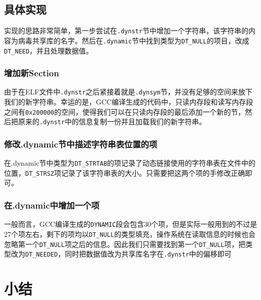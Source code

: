\documentclass[a4paper, 11pt]{article}
\begin{document}
\subsection{具体实现}
实现的思路非常简单，第一步尝试在\texttt{.dynstr}节中增加一个字符串，该字符串的内容为病毒共享库的名字。然后在\texttt{.dynamic}节中找到类型为\texttt{DT\_NULL}的项目，改成\texttt{DT\_NEED}，并且处理数据值。
\subsubsection{增加新Section}
由于在ELF文件中\texttt{.dynstr}之后紧接着就是\texttt{.dynsym}节，并没有足够的空间来放下我们的新字符串。幸运的是，GCC编译生成的代码中，只读内存段和读写内存段之间有\texttt{0x200000}的空间，使得我们可以在只读内存段的最后添加一个新的节，然后把原来的\texttt{.dynstr}中的信息复制一份并且加载我们的新字符串。
\subsubsection{修改.dynamic节中描述字符串表位置的项}
在.dynamic节中类型为\texttt{DT\_STRTAB}的项记录了动态链接使用的字符串表在文件中的位置，\texttt{DT\_STRSZ}项记录了该字符串表的大小。只需要把这两个项的手修改正确即可。
\subsubsection{在.dynamic中增加一个项}
一般而言，GCC编译生成的\texttt{DYNAMIC}段会包含30个项，但是实际一般用到的不过是27个项左右，剩下的项均以\texttt{DT\_NULL}的类型填充，操作系统在读取信息的时候也会忽略第一个\texttt{DT\_NULL}项之后的信息。因此我们只需要找到第一个\texttt{DT\_NULL}项，把类型改为\texttt{DT\_NEEDED}，同时把数据值改为共享库名字在\texttt{.dynstr}中的偏移即可
\section{小结}
\end{document}
